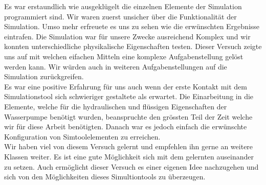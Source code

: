 Es war erstaundlich wie ausgeklügelt die einzelnen Elemente der Simulation programmiert sind. Wir waren zuerst unsicher über die Funktionalität der Simulation. Umso mehr erfreuete es uns zu sehen wie die erwünschten Ergebnisse eintrafen. Die Simulation war für unsere Zwecke ausreichend Komplex und wir konnten unterschiedliche physikalische Eigenschaften testen. Dieser Versuch zeigte uns auf mit welchen eifachen Mitteln eine komplexe Aufgabenstellung gelöst werden kann. Wir würden auch in weiteren Aufgabenstellungen auf die Simulation zurückgreifen.\\
Es war eine positive Erfahrung für uns auch wenn der erste Kontakt mit dem Simulationstool sich schwieriger gestaltete als erwartet. Die Einarbeitung in die Elemente, welche für die hydraulischen und flüssigen  Eigenschaften der Wasserpumpe benötigt wurden, beanspruchte den grössten Teil der Zeit welche wir für diese Arbeit benötigten. Danach war es jedoch einfach die erwünschte Konfiguration von Simtoolelementen zu erreichen.\\
Wir haben viel von diesem Versuch gelernt und empfehlen ihn gerne an weitere Klassen weiter. Es ist eine gute Möglichkeit sich mit dem gelernten auseinander zu setzen. Auch ermöglicht dieser Versuch es einer eigenen Idee nachzugehen und sich von den Möglichkeiten dieses Simultiontools zu überzeugen.
